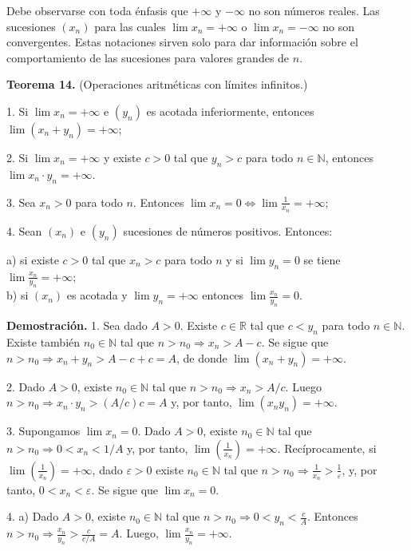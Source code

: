 \documentclass[12pt,oneside]{book}
\begin{document}
Debe observarse con toda énfasis que \(+\infty\) y \(-\infty\) no son números reales. Las sucesiones \((x_n)\) para las cuales \(\lim x_n = +\infty\) o \(\lim x_n = -\infty\) no son convergentes. Estas notaciones sirven solo para dar información sobre el comportamiento de las sucesiones para valores grandes de \(n\).

\textbf{Teorema 14.} (Operaciones aritméticas con límites infinitos.)

1. Si \(\lim x_n = +\infty\) e \((y_n)\) es acotada inferiormente, entonces \(\lim(x_n + y_n) = +\infty\);

2. Si \(\lim x_n = +\infty\) y existe \(c > 0\) tal que \(y_n > c\) para todo \(n \in \mathbb{N}\), entonces \(\lim x_n \cdot y_n = +\infty\).

3. Sea \(x_n > 0\) para todo \(n\). Entonces \(\lim x_n = 0 \iff \lim \frac{1}{x_n} = +\infty\);

4. Sean \((x_n)\) e \((y_n)\) sucesiones de números positivos. Entonces:

a) si existe \(c > 0\) tal que \(x_n > c\) para todo \(n\) y si \(\lim y_n = 0\) se tiene \(\lim \frac{x_n}{y_n} = +\infty\);\\
b) si \((x_n)\) es acotada y \(\lim y_n = +\infty\) entonces \(\lim \frac{x_n}{y_n} = 0\).

\textbf{Demostración.} 1. Sea dado \(A > 0\). Existe \(c \in \mathbb{R}\) tal que \(c < y_n\) para todo \(n \in \mathbb{N}\). Existe también \(n_0 \in \mathbb{N}\) tal que \(n > n_0 \Rightarrow x_n > A - c\). Se sigue que \(n > n_0 \Rightarrow x_n + y_n > A - c + c = A\), de donde \(\lim(x_n + y_n) = +\infty\).

2. Dado \(A > 0\), existe \(n_0 \in \mathbb{N}\) tal que \(n > n_0 \Rightarrow x_n > A/c\). Luego \(n > n_0 \Rightarrow x_n \cdot y_n > (A/c)c = A\) y, por tanto, \(\lim(x_n y_n) = +\infty\).

3. Supongamos \(\lim x_n = 0\). Dado \(A > 0\), existe \(n_0 \in \mathbb{N}\) tal que \(n > n_0 \Rightarrow 0 < x_n < 1/A\) y, por tanto, \(\lim\left(\frac{1}{x_n}\right) = +\infty\). Recíprocamente, si \(\lim\left(\frac{1}{x_n}\right) = +\infty\), dado \(\varepsilon > 0\) existe \(n_0 \in \mathbb{N}\) tal que \(n > n_0 \Rightarrow \frac{1}{x_n} > \frac{1}{\varepsilon}\), y, por tanto, \(0 < x_n < \varepsilon\). Se sigue que \(\lim x_n = 0\).

4. a) Dado \(A > 0\), existe \(n_0 \in \mathbb{N}\) tal que \(n > n_0 \Rightarrow 0 < y_n < \frac{c}{A}\). Entonces \(n > n_0 \Rightarrow \frac{x_n}{y_n} > \frac{c}{c/A} = A\). Luego, \(\lim\frac{x_n}{y_n} = +\infty\).
\end{document}
